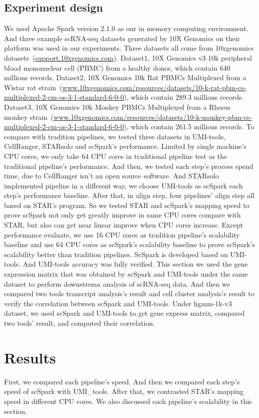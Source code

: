 \documentclass[conference]{IEEEtran}
\begin{document}
\subsection{Experiment design}
We used Apache Spark version 2.1.0 as our in memory computing environment.
And three example scRNA-seq datasets generated by 10X Genomics on their platform was used in our experiments.
Three datasets all come from 10xgenomics datasets~(\url{support.10xgenomics.com}).
Dataset1, 10X Genomics v3 10k peripheral blood mononuclear cell (PBMC) from a healthy donor, which contain 640 millions records.
Dataset2, 10X Genomics 10k Rat PBMCs Multiplexed from a  Wistar rat strain~(\url{www.10xgenomics.com/resources/datasets/10-k-rat-pbm-cs-multiplexed-2-cm-os-3-1-standard-6-0-0}), which contain 289.3 millions records.
Dataset3, 10X Genomics 10k Monkey PBMCs Multiplexed from a Rhesus monkey strain~(\url{www.10xgenomics.com/resources/datasets/10-k-monkey-pbm-cs-multiplexed-2-cm-os-3-1-standard-6-0-0}), which contain 261.5 millions records.
To compare with tradition pipelines, we tested three datasets in UMI-tools, CellRanger, STARsolo and scSpark's performance.
Limited by single machine's CPU cores, we only take 64 CPU cores in traditional pipeline test as the traditional pipeline's performance.
And then, we tested each step's process spend time, due to CellRanger isn't an open source software.
And STARsolo implemented pipeline in a different way, we choose UMI-tools as scSpark each step's performance baseline.
After that, in align step, four pipelines' align step all based on STAR's program.
So we tested STAR and scSpark's mapping speed to prove scSpark not only get greatly improve in same CPU cores compare with STAR, but also can get near linear improve when CPU cores increase.
Except performance evaluate, we use 16 CPU cores as tradition pipeline's scalability baseline and use 64 CPU cores as scSpark's scalability baseline to prove scSpark's scalability better than tradition pipelines.
ScSpark is developed based on UMI-tools. 
And UMI-tools accuracy was fully verified. 
This section we used the gene expression matrix that was obtained by scSpark and UMI-tools under the same dataset to perform downstrema analysis of scRNA-seq data. 
And then we compared two tools transcript analysis's result and cell cluster analysis's result to verify the correlation between scSpark and UMI-tools. 
Under hgmm-1k-v3 dataset, we used scSpark and UMI-tools to get gene express matrix, compared two tools' result, and computed their correlation.

\section{Results}
First, we compared each pipeline's speed.
And then we compared each step's speed of scSpark with UMI\_tools.
After that, we contrasted STAR's mapping speed in different CPU cores.
We also discussed each pipeline's scalability in this section.
\end{document}
